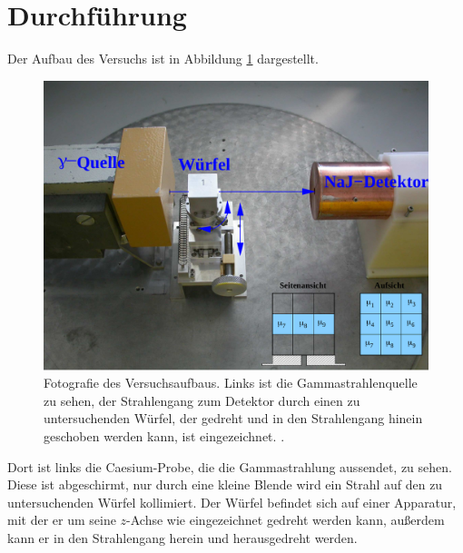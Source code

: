 \section{Durchführung}
\label{sec:Durchführung}

Der Aufbau des Versuchs ist in Abbildung \ref{fig:aufbau} dargestellt.

\begin{figure}
  \centering
  \includegraphics[width=\textwidth]{images/aufbau.png}
  \caption{Fotografie des Versuchsaufbaus. Links ist die Gammastrahlenquelle zu sehen, der Strahlengang zum Detektor durch einen zu untersuchenden Würfel, der gedreht und in den Strahlengang hinein geschoben werden kann, ist eingezeichnet. \cite{Versuchsanleitung}.}
  \label{fig:aufbau}
\end{figure}

Dort ist links die Caesium-Probe, die die Gammastrahlung aussendet, zu sehen. Diese ist abgeschirmt, nur durch eine kleine Blende wird ein Strahl auf den zu untersuchenden Würfel kollimiert. Der Würfel befindet sich auf einer Apparatur, mit der er um seine $z$-Achse wie eingezeichnet gedreht werden kann, außerdem kann er in den Strahlengang herein und herausgedreht werden.

